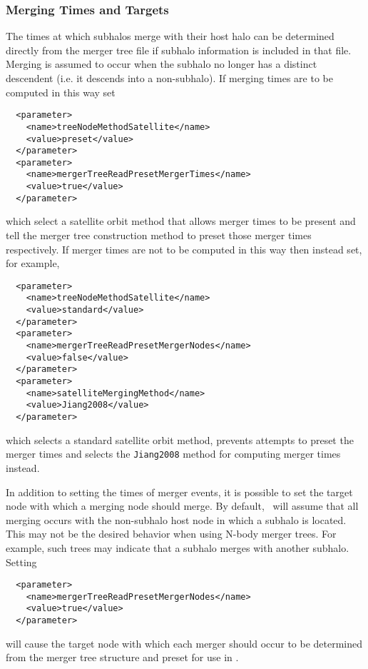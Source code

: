 \subsubsection{Merging Times and Targets}

The times at which subhalos merge with their host halo can be determined directly from the merger tree file if subhalo information is included in that file. Merging is assumed to occur when the subhalo no longer has a distinct descendent (i.e. it descends into a non-subhalo). If merging times are to be computed in this way set
\begin{verbatim}
  <parameter>
    <name>treeNodeMethodSatellite</name>
    <value>preset</value>    
  </parameter>
  <parameter>
    <name>mergerTreeReadPresetMergerTimes</name>
    <value>true</value>    
  </parameter>
\end{verbatim}
which select a satellite orbit method that allows merger times to be present and tell the merger tree construction method to preset those merger times respectively. If merger times are not to be computed in this way then instead set, for example,
\begin{verbatim}
  <parameter>
    <name>treeNodeMethodSatellite</name>
    <value>standard</value>    
  </parameter>
  <parameter>
    <name>mergerTreeReadPresetMergerNodes</name>
    <value>false</value>
  </parameter>
  <parameter>
    <name>satelliteMergingMethod</name>
    <value>Jiang2008</value>
  </parameter>
\end{verbatim}
which selects a standard satellite orbit method, prevents attempts to preset the merger times and selects the {\tt Jiang2008} method for computing merger times instead.

In addition to setting the times of merger events, it is possible to set the target node with which a merging node should merge. By default, \glc\ will assume that all merging occurs with the non-subhalo host node in which a subhalo is located. This may not be the desired behavior when using N-body merger trees. For example, such trees may indicate that a subhalo merges with another subhalo. Setting
\begin{verbatim}
  <parameter>
    <name>mergerTreeReadPresetMergerNodes</name>
    <value>true</value>
  </parameter>
\end{verbatim}
will cause the target node with which each merger should occur to be determined from the merger tree structure and preset for use in \glc.

